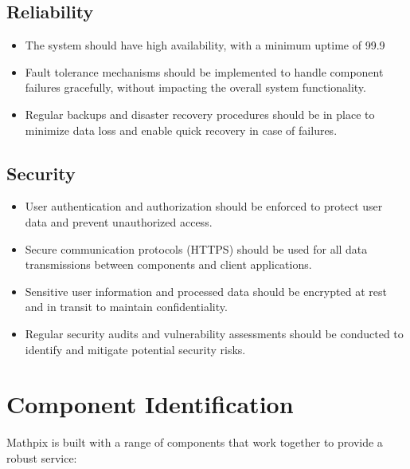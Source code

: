 \documentclass{article}
\begin{document}
\subsection{Reliability}
\begin{itemize}
\item The system should have high availability, with a minimum uptime of 99.9%
\item Fault tolerance mechanisms should be implemented to handle component failures gracefully, without impacting the overall system functionality.
\item Regular backups and disaster recovery procedures should be in place to minimize data loss and enable quick recovery in case of failures.
\end{itemize}

\subsection{Security}
\begin{itemize}
\item User authentication and authorization should be enforced to protect user data and prevent unauthorized access.
\item Secure communication protocols (HTTPS) should be used for all data transmissions between components and client applications.
\item Sensitive user information and processed data should be encrypted at rest and in transit to maintain confidentiality.
\item Regular security audits and vulnerability assessments should be conducted to identify and mitigate potential security risks.
\end{itemize}

\section{Component Identification}
Mathpix is built with a range of components that work together to provide a robust service:
\end{document}
